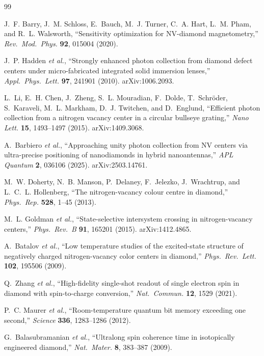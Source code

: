 \documentclass[11pt,letterpaper]{article}
\begin{document}
\begin{thebibliography}{99}

J.~F. Barry, J.~M. Schloss, E.~Bauch, M.~J. Turner, C.~A. Hart,
L.~M. Pham, and R.~L. Walsworth,
``Sensitivity optimization for NV-diamond magnetometry,''
\emph{Rev.\ Mod.\ Phys.} \textbf{92}, 015004 (2020).

J.~P. Hadden \emph{et al.},
``Strongly enhanced photon collection from diamond defect centers under
micro-fabricated integrated solid immersion lenses,''
\emph{Appl.\ Phys.\ Lett.} \textbf{97}, 241901 (2010).
arXiv:1006.2093.

L.~Li, E.~H. Chen, J.~Zheng, S.~L. Mouradian, F.~Dolde, T.~Schr\"oder,
S.~Karaveli, M.~L. Markham, D.~J. Twitchen, and D.~Englund,
``Efficient photon collection from a nitrogen vacancy center in a circular
bullseye grating,''
\emph{Nano Lett.} \textbf{15}, 1493--1497 (2015).
arXiv:1409.3068.

A.~Barbiero \emph{et al.},
``Approaching unity photon collection from NV centers via ultra-precise
positioning of nanodiamonds in hybrid nanoantennas,''
\emph{APL Quantum} \textbf{2}, 036106 (2025).
arXiv:2503.14761.

M.~W. Doherty, N.~B. Manson, P.~Delaney, F.~Jelezko, J.~Wrachtrup,
and L.~C.~L. Hollenberg,
``The nitrogen-vacancy colour centre in diamond,''
\emph{Phys.\ Rep.} \textbf{528}, 1--45 (2013).

M.~L. Goldman \emph{et al.},
``State-selective intersystem crossing in nitrogen-vacancy centers,''
\emph{Phys.\ Rev.\ B} \textbf{91}, 165201 (2015).
arXiv:1412.4865.

A.~Batalov \emph{et al.},
``Low temperature studies of the excited-state structure of negatively charged
nitrogen-vacancy color centers in diamond,''
\emph{Phys.\ Rev.\ Lett.} \textbf{102}, 195506 (2009).

Q.~Zhang \emph{et al.},
``High-fidelity single-shot readout of single electron spin in diamond with
spin-to-charge conversion,''
\emph{Nat.\ Commun.} \textbf{12}, 1529 (2021).

P.~C. Maurer \emph{et al.},
``Room-temperature quantum bit memory exceeding one second,''
\emph{Science} \textbf{336}, 1283--1286 (2012).

G.~Balasubramanian \emph{et al.},
``Ultralong spin coherence time in isotopically engineered diamond,''
\emph{Nat.\ Mater.} \textbf{8}, 383--387 (2009).


\end{thebibliography}
\end{document}
